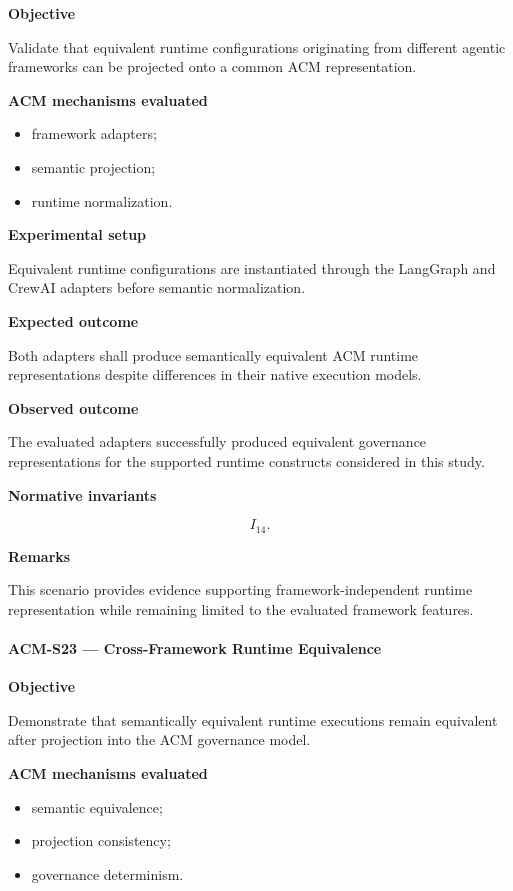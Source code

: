 \documentclass[10pt]{article}
\begin{document}
\textbf{Objective}

Validate that equivalent runtime configurations originating from different
agentic frameworks can be projected onto a common ACM representation.

\textbf{ACM mechanisms evaluated}

\begin{itemize}
    \item framework adapters;
    \item semantic projection;
    \item runtime normalization.
\end{itemize}

\textbf{Experimental setup}

Equivalent runtime configurations are instantiated through the LangGraph and
CrewAI adapters before semantic normalization.

\textbf{Expected outcome}

Both adapters shall produce semantically equivalent ACM runtime
representations despite differences in their native execution models.

\textbf{Observed outcome}

The evaluated adapters successfully produced equivalent governance
representations for the supported runtime constructs considered in this study.

\textbf{Normative invariants}

\[
I_{14}.
\]

\textbf{Remarks}

This scenario provides evidence supporting framework-independent runtime
representation while remaining limited to the evaluated framework features.

\paragraph{ACM-S23 --- Cross-Framework Runtime Equivalence}

\textbf{Objective}

Demonstrate that semantically equivalent runtime executions remain equivalent
after projection into the ACM governance model.

\textbf{ACM mechanisms evaluated}

\begin{itemize}
    \item semantic equivalence;
    \item projection consistency;
    \item governance determinism.
\end{itemize}
\end{document}
